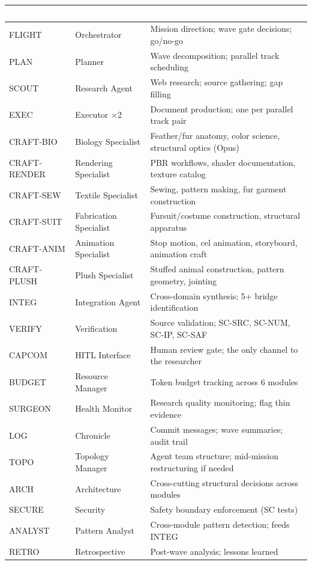 \documentclass[11pt,letterpaper]{article}
\newcommand{\tableheader}[1]{\textbf{\sffamily\textcolor{white}{#1}}}
\begin{document}
\begin{center}
\begin{tabularx}{\textwidth}{L{2cm}L{3cm}X}
\toprule
{}
\tableheader{Role} & \tableheader{Agent} & \tableheader{Responsibility} \\
\midrule
FLIGHT & Orchestrator & Mission direction; wave gate decisions; go/no-go \\
PLAN & Planner & Wave decomposition; parallel track scheduling \\
SCOUT & Research Agent & Web research; source gathering; gap filling \\
EXEC & Executor $\times$2 & Document production; one per parallel track pair \\
CRAFT-BIO & Biology Specialist & Feather/fur anatomy, color science, structural optics (Opus) \\
CRAFT-RENDER & Rendering Specialist & PBR workflows, shader documentation, texture catalog \\
CRAFT-SEW & Textile Specialist & Sewing, pattern making, fur garment construction \\
CRAFT-SUIT & Fabrication Specialist & Fursuit/costume construction, structural apparatus \\
CRAFT-ANIM & Animation Specialist & Stop motion, cel animation, storyboard, animation craft \\
CRAFT-PLUSH & Plush Specialist & Stuffed animal construction, pattern geometry, jointing \\
INTEG & Integration Agent & Cross-domain synthesis; 5+ bridge identification \\
VERIFY & Verification & Source validation; SC-SRC, SC-NUM, SC-IP, SC-SAF \\
CAPCOM & HITL Interface & Human review gate; the only channel to the researcher \\
BUDGET & Resource Manager & Token budget tracking across 6 modules \\
SURGEON & Health Monitor & Research quality monitoring; flag thin evidence \\
LOG & Chronicle & Commit messages; wave summaries; audit trail \\
TOPO & Topology Manager & Agent team structure; mid-mission restructuring if needed \\
ARCH & Architecture & Cross-cutting structural decisions across modules \\
SECURE & Security & Safety boundary enforcement (SC tests) \\
ANALYST & Pattern Analyst & Cross-module pattern detection; feeds INTEG \\
RETRO & Retrospective & Post-wave analysis; lessons learned \\
\bottomrule
\end{tabularx}
\end{center}
\end{document}
